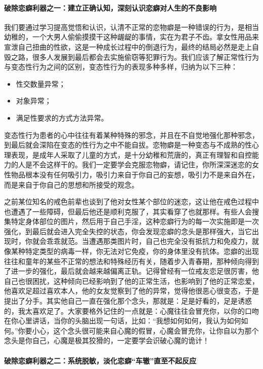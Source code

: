 \paragraph{破除恋癖利器之一：建立正确认知，深刻认识恋癖对人生的不良影响}

我们要通过学习提高觉悟和认识，认清不正常的恋物癖是一种错误的行为，是相当幼稚的，一个大男人偷偷摸摸干这种龌龊的事情，实在为君子不齿。拿女性用品来宣泄自己扭曲的性欲，这是一种成长过程中的倒退行为，最终的结局必然是走上自毁之路，很多人发展到最后都会去实施偷窃等犯罪行为。我们应该了解正常性行为与变态性行为之间的区别，变态性行为的表现多种多样，归纳为以下三种：

\begin{itemize}
    \item 性交数量异常；
    \item 对象异常；
    \item 满足性要求的方式方法异常。
\end{itemize}

变态性行为患者的心中往往有着某种特殊的邪念，并且在不自觉地强化那种邪念，到最后就会深陷在变态的性行为之中不能自拔。恋物癖是一种变态与不成熟的性心理表现，是成年人采取了儿童的方式，是十分幼稚和荒唐的，真正有理智和自控能力的人是不会这样干的。我们一定要学会克服恋物癖，请记住，你所深深迷恋的女性物品根本没有任何吸引力，吸引力来自于你自己的妄想，吸引力不是来自外在，而是来自于你自己的思想和所接受的观念。

之前某位知名的戒色前辈也谈到了他对女性某个部位的迷恋，这让他在戒色过程中也遭遇了一些障碍，但最后他还是顺利克服了，其实看穿了也就那样。有些人会搜集特定身体部位的图片，然后用于自己手淫，这种恋癖行为的每一次实施即是一次强化，到最后就会进入完全失控的状态，你会发现恋癖的念头是那样强大，当它出现时，你就会乖乖就范。当遭遇那类图片时，自己也完全没有抵抗力和免疫力，就像某种特定类型的病毒一样，你无法对它免疫，你的身体里没有抗体。恋癖的出现往往和童年的某些不正常的想法和特殊经历有关，随着步入青春期，那种倾向得到了进一步的强化，最后就会越来越偏离正轨。记得曾经有一位戒友恋足很厉害，他自己也很困扰，这种倾向已经影响到了他的正常生活，也影响到了他的正常恋爱，他喜欢足超过喜欢本人，他的女友觉察到了他的异常，觉得他很恶心很变态，于是提出了分手。其实他自己一直在强化那个念头，那就是：足是好看的，足是诱惑的，我太喜欢足了。大家要格外记住的一点就是：心魔往往会冒充你，以你的口吻在你心里讲话，当你的头脑出现一句话，比如：“我想如何如何，我认为如何如何。”你要小心，这个念头很可能来自心魔的假冒，心魔会冒充你，让你自以为那个念头是你自己，心魔是极其狡猾的，一定要学会识破心魔的诡计！

\paragraph{破除恋癖利器之二：系统脱敏，淡化恋癖“车辙”直至不起反应}

